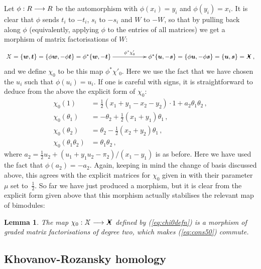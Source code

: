 \documentclass{compositio}
\newtheorem{lemma}[theorem]{Lemma}
\theoremstyle{definition}
\numberwithin{equation}{section}
\begin{document}
Let $\phi: R \longrightarrow R$ be the automorphism with $\phi(x_i) = y_i$ and $\phi(y_i) = x_i$. It is clear that $\phi$ sends $t_i$ to $-t_i$, $s_i$ to $-s_i$ and $W$ to $-W$, so that by pulling back along $\phi$ (equivalently, applying $\phi$ to the entries of all matrices) we get a morphism of matrix factorisations of $W$: 
\[
\xymatrix{
\Xcirc = \{ \bs{w}, \bs{t} \} = \{ \phi\bs{w}, -\phi \bs{t} \} = \phi^*\{ \bs{w}, -\bs{t} \} \ar[rr]^-{\phi^* \chi'_0} & & \phi^*\{ \bs{u}, -\bs{s} \} = \{ \phi \bs{u}, -\phi \bs{s} \} = \{ \bs{u}, \bs{s} \} = \Xbul \, ,
}
\]
and we define $\chi_0$ to be this map $\phi^* \chi'_0$. Here we use the fact that we have chosen the $u_i$ such that $\phi(u_i) = u_i$. If one is careful with signs, it is straightforward to deduce from the above the explicit form of $\chi_0$:
\begin{align}
\chi_0(1) &= \frac{1}{2}(x_1 + y_1 - x_2 - y_2) \cdot 1 + a_2 \theta_1 \theta_2 \, ,\nonumber \\
\chi_0(\theta_1) &= -\theta_2 + \frac{1}{2}(x_1 + y_1) \theta_1\, ,\nonumber \\
\chi_0(\theta_2) &= \theta_2 - \frac{1}{2}(x_2 + y_2)\theta_1\, , \nonumber \\
\chi_0(\theta_1\theta_2) &= \theta_1\theta_2\,, \label{eq:chi0defn}
\end{align}
where $a_2 = \frac{1}{2}u_2 + (u_1 + y_1 u_2 - \pi_2)/(x_1-y_1)$ is as before. Here we have used the fact that $\phi(a_2) = -a_2$. Again, keeping in mind the change of basis discussed above, this agrees with the explicit matrices for $\chi_0$ given in \cite[p.50]{kr0401268} with their parameter~$\mu$ set to~$\frac{1}{2}$. So far we have just produced a morphism, but it is clear from the explicit form given above that this morphism actually stabilises the relevant map of bimodules:

\begin{lemma} The map $\chi_0: \Xcirc \lto \Xbul$ defined by (\ref{eq:chi0defn}) is a morphism of graded matrix factorisations of degree two, which makes (\ref{eq:cons50}) commute.
\end{lemma}

\subsection{Khovanov-Rozansky homology}
\end{document}
